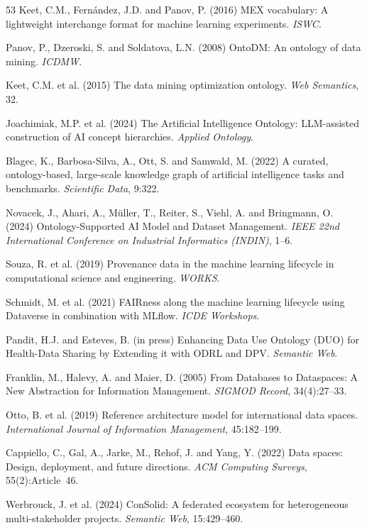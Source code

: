 \documentclass[Afour,sagev,times]{sagej}
\begin{document}
\begin{thebibliography}{53}
 Keet, C.M., Fern\'andez, J.D. and Panov, P. (2016) MEX vocabulary: A lightweight interchange format for machine learning experiments. \emph{ISWC}.

 Panov, P., Dzeroski, S. and Soldatova, L.N. (2008) OntoDM: An ontology of data mining. \emph{ICDMW}.

 Keet, C.M. et al. (2015) The data mining optimization ontology. \emph{Web Semantics}, 32.

 Joachimiak, M.P. et al. (2024) The Artificial Intelligence Ontology: LLM-assisted construction of AI concept hierarchies. \emph{Applied Ontology}.

 Blagec, K., Barbosa-Silva, A., Ott, S. and Samwald, M. (2022) A curated, ontology-based, large-scale knowledge graph of artificial intelligence tasks and benchmarks. \emph{Scientific Data}, 9:322.

 Novacek, J., Ahari, A., M\"uller, T., Reiter, S., Viehl, A. and Bringmann, O. (2024) Ontology-Supported AI Model and Dataset Management. \emph{IEEE 22nd International Conference on Industrial Informatics (INDIN)}, 1--6.

 Souza, R. et al. (2019) Provenance data in the machine learning lifecycle in computational science and engineering. \emph{WORKS}.

 Schmidt, M. et al. (2021) FAIRness along the machine learning lifecycle using Dataverse in combination with MLflow. \emph{ICDE Workshops}.

 Pandit, H.J. and Esteves, B. (in press) Enhancing Data Use Ontology (DUO) for Health-Data Sharing by Extending it with ODRL and DPV. \emph{Semantic Web}.

 Franklin, M., Halevy, A. and Maier, D. (2005) From Databases to Dataspaces: A New Abstraction for Information Management. \emph{SIGMOD Record}, 34(4):27--33.

 Otto, B. et al. (2019) Reference architecture model for international data spaces. \emph{International Journal of Information Management}, 45:182--199.

 Cappiello, C., Gal, A., Jarke, M., Rehof, J. and Yang, Y. (2022) Data spaces: Design, deployment, and future directions. \emph{ACM Computing Surveys}, 55(2):Article~46.

 Werbrouck, J. et al. (2024) ConSolid: A federated ecosystem for heterogeneous multi-stakeholder projects. \emph{Semantic Web}, 15:429--460.


\end{thebibliography}
\end{document}
